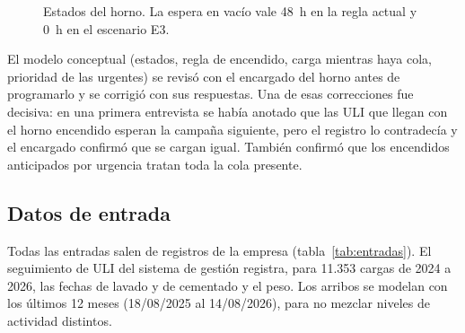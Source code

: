 \documentclass[a4paper,11pt]{article}
\begin{document}
\begin{figure}[H]
\centering
{}
\caption{Estados del horno. La espera en vacío vale 48~h en la regla actual y 0~h en el escenario E3.}
\label{fig:estados}
\end{figure}

El modelo conceptual (estados, regla de encendido, carga mientras haya cola, prioridad de las urgentes) se
revisó con el encargado del horno antes de programarlo y se corrigió con sus respuestas. Una de esas
correcciones fue decisiva: en una primera entrevista se había anotado que las ULI que llegan con el horno
encendido esperan la campaña siguiente, pero el registro lo contradecía y el encargado confirmó que se cargan
igual. También confirmó que los encendidos anticipados por urgencia tratan toda la cola presente.

\subsection{Datos de entrada}

Todas las entradas salen de registros de la empresa (tabla~\ref{tab:entradas}). El seguimiento de ULI del
sistema de gestión registra, para 11.353 cargas de 2024 a 2026, las fechas de lavado y de cementado y el
peso. Los arribos se modelan con los últimos 12 meses (18/08/2025 al 14/08/2026), para no mezclar niveles de
actividad distintos.
\end{document}
